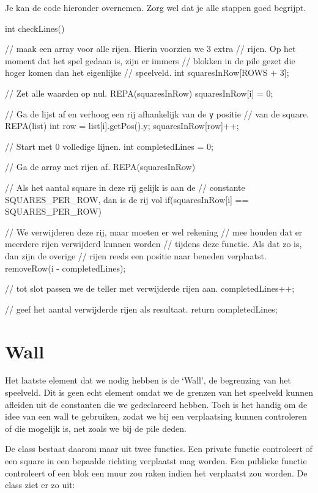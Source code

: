 Je kan de code hieronder overnemen. Zorg wel dat je alle stappen goed begrijpt.

\begin{code}
int checkLines()
{
	// maak een array voor alle rijen. Hierin voorzien we 3 extra 
	// rijen. Op het moment dat het spel gedaan is, zijn er immers
	// blokken in de pile gezet die hoger komen dan het eigenlijke 
	// speelveld.
	int squaresInRow[ROWS + 3];
	
	// Zet alle waarden op nul.
	REPA(squaresInRow) squaresInRow[i] = 0;
	
	// Ga de lijst af en verhoog een rij afhankelijk van de \verb|y| positie 
	// van de square.
	REPA(list)
	{
		 int row = list[i].getPos().y;
		 squaresInRow[row]++;
	}
	
	// Start met 0 volledige lijnen.
	int completedLines = 0;
	
	// Ga de array met rijen af.
	REPA(squaresInRow)
	{
		 // Als het aantal square in deze rij gelijk is aan de 
		 // constante SQUARES_PER_ROW, dan is de rij vol
		 if(squaresInRow[i] == SQUARES_PER_ROW)
		 {
				// We verwijderen deze rij, maar moeten er wel rekening
				// mee houden dat er meerdere rijen verwijderd kunnen worden
				// tijdens deze functie. Als dat zo is, dan zijn de overige
				// rijen reeds een positie naar beneden verplaatst.
				removeRow(i - completedLines);
				
				// tot slot passen we de teller met verwijderde rijen aan.
				completedLines++;           
		 }
	}
	
	// geef het aantal verwijderde rijen als resultaat.
	return completedLines;
}
\end{code}

\section{Wall}
Het laatste element dat we nodig hebben is de `Wall', de begrenzing van het speelveld. Dit is geen echt element omdat we de grenzen van het speelveld kunnen afleiden uit de constanten die we gedeclareerd hebben. Toch is het handig om de idee van een wall te gebruiken, zodat we bij een verplaatsing kunnen controleren of die mogelijk is, net zoals we bij de pile deden.

De class bestaat daarom maar uit twee functies. Een private functie  controleert of een square in een bepaalde richting verplaatst mag worden. Een publieke functie  controleert of een blok een muur zou raken indien het verplaatst zou worden. De class ziet er zo uit:

